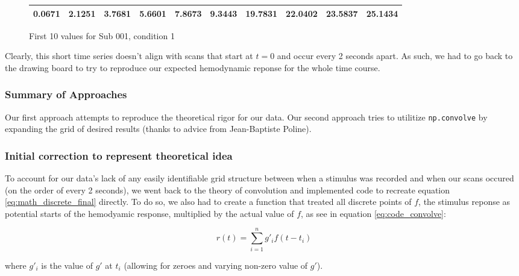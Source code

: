 \documentclass[11pt]{article}
\begin{document}
\vspace{5mm}

\begin{figure}[ht]
\begin{center}
\begin{tabular}{|cccccccccc|}
  \hline
0.0671 &
2.1251 &
3.7681 &
5.6601 &
7.8673 &
9.3443 &
19.7831 &
22.0402 &
23.5837 &
25.1434 \\
 \hline

  \end{tabular}
   \caption{First 10 values for Sub 001, condition 1}
  \label{table:cond1}
\end{center}
\end{figure}
 
Clearly, this short time series doesn't align with scans that start at 
$t=0$ and occur every 2 seconds apart. As such, we had to go back to the 
drawing board to try to reproduce our expected hemodynamic reponse for the 
whole time course.



\subsubsection{Summary of Approaches}
Our first approach attempts to reproduce the theoretical rigor for our data. 
Our second approach tries to utilitize \texttt{np.convolve} by expanding the 
grid of desired results (thanks to advice from Jean-Baptiste Poline).




\subsubsection{Initial correction to represent theoretical idea}
To account for our data's lack of any easily identifiable grid structure 
between when a stimulus was recorded and when our scans occured (on the 
order of every 2 seconds), we went back to the theory of convolution and 
implemented code to recreate equation \ref{eq:math_discrete_final} directly. 
To do so, we also had to create a function that treated all discrete points 
of $f$, the stimulus reponse as potential starts of the hemodyamic response, 
multiplied by the actual value of $f$, as see in equation 
\ref{eq:code_convolve}:

\begin{equation} \label{eq:code_convolve}
r(t)= \sum_{i=1}^n g'_{i} f(t-t_i)
\end{equation}

where $g'_{i}$ is the value of $g'$ at $t_i$ (allowing for zeroes and varying 
non-zero value of $g'$).
\end{document}
